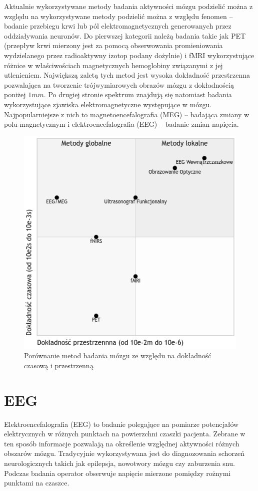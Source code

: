 \documentclass{./assets/wfis}
\begin{document}
Aktualnie wykorzystywane metody badania aktywności mózgu podzielić można z względu na wykorzystywane metody podzielić można z względu fenomen – badanie przebiegu krwi lub pól elektromagnetycznych generowanych przez oddziaływania neuronów. Do pierwszej kategorii należą badania takie jak PET (przepływ krwi mierzony jest za pomocą obserwowania promieniowania wydzielanego przez radioaktywny izotop podany dożylnie) i fMRI wykorzystujące różnice w właściwościach magnetycznych hemoglobiny związanymi z jej utlenieniem. Największą zaletą tych metod jest wysoka dokładność przestrzenna pozwalająca na tworzenie trójwymiarowych obrazów mózgu z dokładnością poniżej $1mm$. Po drugiej stronie  spektrum znajdują się natomiast badania wykorzystujące zjawiska elektromagnetyczne występujące w mózgu. Najpopularniejsze z nich to magnetoencefalografia (MEG) – badająca zmiany w polu magnetycznym i elektroencefalografia (EEG) – badanie zmian napięcia. 

\begin{figure}[h]
    \centering
    \includegraphics[width=0.5\columnwidth]{thesis/assets/porownanie_metod_badania_mozgu.png}
    \caption{Porównanie metod badania mózgu ze względu na dokładność czasową i przestrzenną}
    \label{fig:brain-imaging-comparasion}
\end{figure}

\section{EEG}
Elektroencefalografia (EEG) to badanie polegające na pomiarze potencjałów elektrycznych w różnych punktach na powierzchni czaszki pacjenta. Zebrane w ten sposób informacje pozwalają na określenie względnej aktywności różnych obszarów mózgu. Tradycyjnie wykorzystywana jest do diagnozowania schorzeń neurologicznych takich jak epilepsja, nowotwory mózgu czy zaburzenia snu. Podczas badania operator obserwuje napięcie mierzone pomiędzy rożnymi punktami na czaszce. 
\end{document}
